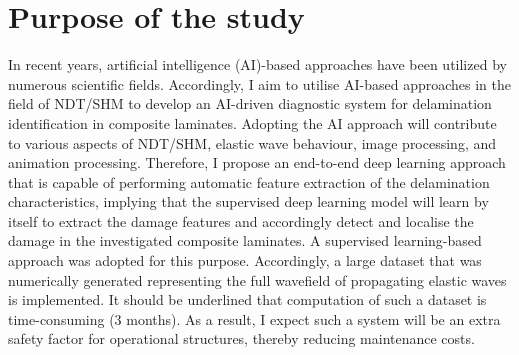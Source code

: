 \section{Purpose of the study}
\label{sec12}
In recent years, artificial intelligence (AI)-based approaches have been utilized by numerous scientific fields.
Accordingly, I aim to utilise AI-based approaches in the field of NDT/SHM to develop an AI-driven diagnostic system for delamination identification in composite laminates.
Adopting the AI approach will contribute to various aspects of NDT/SHM, elastic wave behaviour, image processing, and animation processing.
Therefore, I propose an end-to-end deep learning approach that is capable of performing automatic feature extraction of the delamination characteristics, implying that the supervised deep learning model will learn by itself to extract the damage features and accordingly detect and localise the damage in the investigated composite laminates.
A supervised learning-based approach was adopted for this purpose.
Accordingly, a large dataset that was numerically generated representing the full wavefield of propagating elastic waves is implemented.
It should be underlined that computation of such a dataset is time-consuming (3 months).
As a result, I expect such a system will be an extra safety factor for operational structures, thereby reducing maintenance costs.
